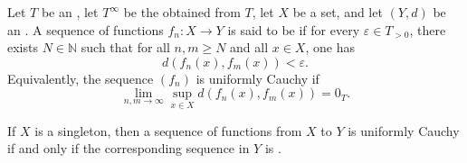 \begin{definition} \label{definition:uniformly_Cauchy_sequence_of_functions_from_a_set_to_an_extended_metric_space_valued_in_ordered_commutative_monoid_with_adjoined_infinity}
    Let $T$ be an , let $T^\infty$ be the  obtained from $T$, let $X$ be a set, and let $(Y, d)$ be an .
    A sequence of functions $f_n : X \to Y$ is said to be  if for every $\varepsilon \in T_{>0}$, there exists $N \in \mathbb{N}$ such that for all $n, m \geq N$ and all $x \in X$, one has
    $$d(f_n(x), f_m(x)) < \varepsilon.$$
    Equivalently, the sequence $(f_n)$ is uniformly Cauchy if
    $$\lim_{n,m \to \infty} \sup_{x \in X} d(f_n(x), f_m(x)) = 0_T.$$

    If $X$ is a singleton, then a sequence of functions from $X$ to $Y$ is uniformly Cauchy if and only if the corresponding sequence in $Y$ is .
\end{definition}
